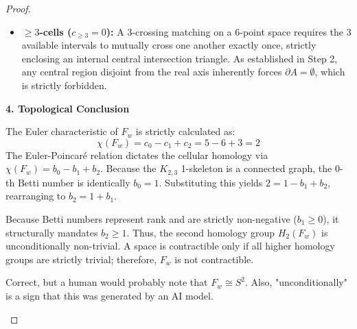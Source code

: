 \documentclass[12pt]{article}
\newcommand{\review}[1]{\begin{reviewbox}#1\end{reviewbox}}
\begin{document}
\begin{proof}
\begin{itemize}
    \review{Again, it would probably be faster to look at all 15 endpoint subsets and consider the ones that have exactly 2 crossings.}
    \item \textbf{$\geq 3$-cells ($c_{\geq 3}=0$):} A 3-crossing matching on a 6-point space requires the 3 available intervals to mutually cross one another exactly once, strictly enclosing an internal central intersection triangle. As established in Step 2, any central region disjoint from the real axis inherently forces $\partial A = \emptyset$, which is strictly forbidden. 
\end{itemize}

\vspace{1em}
\noindent\textbf{4. Topological Conclusion}

The Euler characteristic of $F_w$ is strictly calculated as:
\[
\chi(F_w) = c_0 - c_1 + c_2 = 5 - 6 + 3 = 2
\]
The Euler-Poincaré relation dictates the cellular homology via $\chi(F_w) = b_0 - b_1 + b_2$. Because the $K_{2,3}$ 1-skeleton is a connected graph, the 0-th Betti number is identically $b_0 = 1$. Substituting this yields $2 = 1 - b_1 + b_2$, rearranging to $b_2 = 1 + b_1$. 

Because Betti numbers represent rank and are strictly non-negative ($b_1 \geq 0$), it structurally mandates $b_2 \geq 1$. Thus, the second homology group $H_2(F_w)$ is unconditionally non-trivial. A space is contractible only if all higher homology groups are strictly trivial; therefore, $F_w$ is not contractible.

\review{Correct, but a human would probably note that $F_w \cong S^2$. Also, "unconditionally" is a sign that this was generated by an AI model.}
\end{proof}
\end{document}
